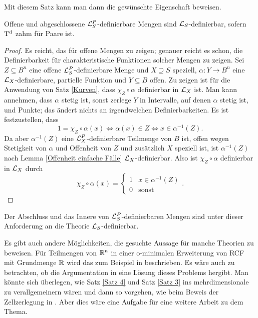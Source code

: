 Mit diesem Satz kann man dann die gewünschte Eigenschaft beweisen.

\begin{theorem}
	Offene und abgeschlossene $\mathcal{L}^P_S$-definierbare Mengen sind $\mathcal{L}_S$-definierbar, sofern $\operatorname{T^d}$ zahm für Paare ist.
\end{theorem}
\begin{proof}
	Es reicht, das für offene Mengen zu zeigen; genauer reicht es schon, die Definierbarkeit für charakteristische Funktionen solcher Mengen zu zeigen. Sei $Z\subseteq B^n$ eine offene $\mathcal{L}^P_S$-definierbare Menge und $X\supseteq S$ speziell, $\alpha:Y\rightarrow B^n$ eine $\mathcal{L}_X$-definierbare, partielle Funktion und $Y\subseteq B$ offen. Zu zeigen ist für die Anwendung von Satz \ref{Kurven}, dass $\chi_Z\circ\alpha$ definierbar in $\mathcal{L}_X$ ist.\newpage
	Man kann annehmen, dass $\alpha$ stetig ist, sonst zerlege $Y$ in Intervalle, auf denen $\alpha$ stetig ist, und Punkte; das ändert nichts an irgendwelchen Definierbarkeiten. Es ist festzustellen, dass $$1=\chi_Z\circ\alpha(x)\Leftrightarrow\alpha(x)\in Z\Leftrightarrow x\in\alpha^{-1}(Z).$$ Da aber $\alpha^{-1}(Z)$ eine $\mathcal{L}^P_X$-definierbare Teilmenge von $B$ ist, offen wegen Stetigkeit von $\alpha$ und Offenheit von $Z$ und zusätzlich $X$ speziell ist, ist $\alpha^{-1}(Z)$ nach Lemma \ref{Offenheit einfache Fälle} $\mathcal{L}_X$-definierbar. Also ist $\chi_Z\circ\alpha$ definierbar in $\mathcal{L}_X$ durch $$\chi_Z\circ\alpha(x)=\left\{\begin{array}{ll}
	1&x\in\alpha^{-1}(Z)\\
	0&\text{sonst}
	\end{array}\right..$$
\end{proof}

\begin{corollary}
	Der Abschluss und das Innere von $\mathcal{L}^P_S$-definierbaren Mengen sind unter dieser Anforderung an die Theorie $\mathcal{L}_S$-definierbar.
\end{corollary}

Es gibt auch andere Möglichkeiten, die gesuchte Aussage für manche Theorien zu beweisen. Für Teilmengen von $\mathbb{R}^n$ in einer o-minimalen Erweiterung von RCF mit Grundmenge $\mathbb{R}$ wird das zum Beispiel in \cite{VanDenDries} beschrieben. Es wäre auch zu betrachten, ob die Argumentation in \cite{DieMoeglicheLoesung} eine Lösung dieses Problems hergibt. Man könnte sich überlegen, wie Satz \ref{Satz 4} und Satz \ref{Satz 3} ins mehrdimensionale zu verallgemeinern wären und dann so vorgehen, wie beim Beweis der Zellzerlegung in \cite{vdDZellzerlegung}. Aber dies wäre eine Aufgabe für eine weitere Arbeit zu dem Thema.